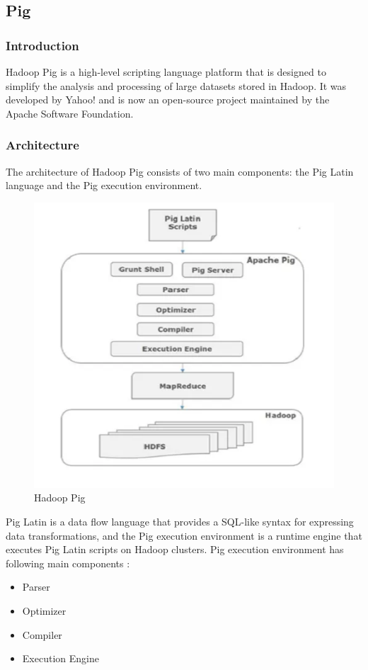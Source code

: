 \documentclass[12pt]{article}
\begin{document}
\subsection{Pig}
\subsubsection{Introduction}
Hadoop Pig is a high-level scripting language platform that is designed to simplify the analysis and processing of large datasets stored in Hadoop. It was developed by Yahoo! and is now an open-source project maintained by the Apache Software Foundation.
\subsubsection{Architecture}
The architecture of Hadoop Pig consists of two main components: the Pig Latin language and the Pig execution environment. 
\begin{figure}[h!]
    \centering
    \includegraphics[scale = 0.4]{images/pig.png}
    \caption{Hadoop Pig}
\end{figure}

Pig Latin is a data flow language that provides a SQL-like syntax for expressing data transformations, and the Pig execution environment is a runtime engine that executes Pig Latin scripts on Hadoop clusters. Pig execution environment has following main components : 
\begin{itemize}
    \item Parser
    \item Optimizer
    \item Compiler
    \item Execution Engine
\end{itemize}
\end{document}
